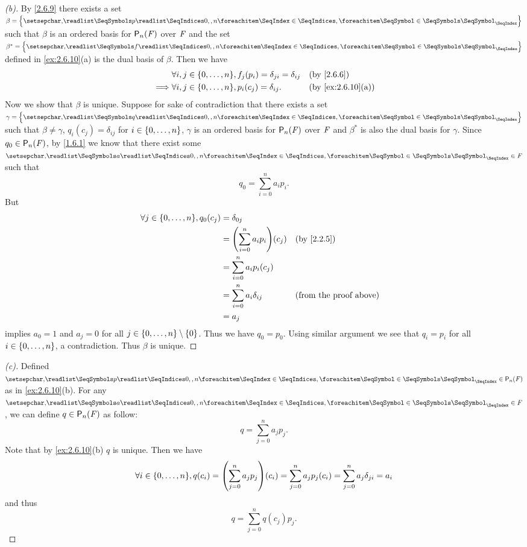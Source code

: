 \begin{proof}[(b)]
	By \cref{2.6.9} there exists a set \(\beta = \set{\seq{p}{0,,n}}\) such that \(\beta\) is an ordered basis for \(\ps[n]{\F}\) over \(\mathit{F}\) and the set \(\beta^* = \set{\seq{f}{0,,n}}\) defined in \cref{ex:2.6.10}(a) is the dual basis of \(\beta\).
	Then we have
	\begin{align*}
		         & \forall i, j \in \set{0, \dots, n}, f_j(p_i) = \delta_{j i} = \delta_{i j} &  & \by{2.6.6}        \\
		\implies & \forall i, j \in \set{0, \dots, n}, p_i(c_j) = \delta_{i j}.               &  & \by{ex:2.6.10}[a]
	\end{align*}
	Now we show that \(\beta\) is unique.
	Suppose for sake of contradiction that there exists a set \(\gamma = \set{\seq{q}{0,,n}}\) such that \(\beta \neq \gamma\), \(q_i(c_j) = \delta_{i j}\) for \(i \in \left\lbrace0, \dots, n\right\rbrace\), \(\gamma\) is an ordered basis for \(\ps[n]{\F}\) over \(\mathit{F}\) and \(\beta^*\) is also the dual basis for \(\gamma\).
	Since \(q_0 \in \ps[n]{\F}\), by \cref{1.6.1} we know that there exist some \(\seq{a}{0,,n} \in \F\) such that
	\[
		q_0 = \sum_{i = 0}^n a_i p_i.
	\]
	But
	\begin{align*}
		\forall j \in \set{0, \dots, n}, q_0(c_j) & = \delta_{0 j}                                                        \\
		                                          & = \pa{\sum_{i = 0}^n a_i p_i}(c_j) &  & \by{2.2.5}                    \\
		                                          & = \sum_{i = 0}^n a_i p_i(c_j)                                         \\
		                                          & = \sum_{i = 0}^n a_i \delta_{i j}  &  & \text{(from the proof above)} \\
		                                          & = a_j
	\end{align*}
	implies \(a_0 = 1\) and \(a_j = 0\) for all \(j \in \left\lbrace0, \dots, n\right\rbrace \setminus \left\lbrace0\right\rbrace\).
	Thus we have \(q_0 = p_0\).
	Using similar argument we see that \(q_i = p_i\) for all \(i \in \left\lbrace0, \dots, n\right\rbrace\), a contradiction.
	Thus \(\beta\) is unique.
\end{proof}

\begin{proof}[(c)]
	Defined \(\seq{p}{0,,n} \in \ps[n]{\F}\) as in \cref{ex:2.6.10}(b).
	For any \(\seq{a}{0,,n} \in \F\), we can define \(q \in \ps[n]{\F}\) as follow:
	\[
		q = \sum_{j = 0}^n a_j p_j.
	\]
	Note that by \cref{ex:2.6.10}(b) \(q\) is unique.
	Then we have
	\[
		\forall i \in \set{0, \dots, n}, q(c_i) = \pa{\sum_{j = 0}^n a_j p_j}(c_i) = \sum_{j = 0}^n a_j p_j(c_i) = \sum_{j = 0}^n a_j \delta_{j i} = a_i
	\]
	and thus
	\[
		q = \sum_{j = 0}^n q(c_j) p_j.
	\]
\end{proof}

